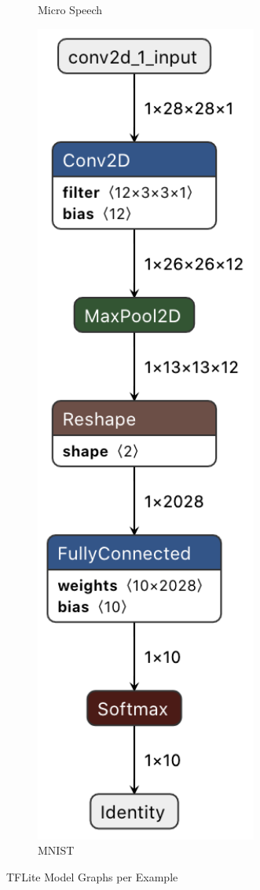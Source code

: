 \documentclass[oneside]{tum-book}
\begin{document}
\begin{figure}[h]
\begin{subfigure}[b]{0.3\textwidth}
         \caption{Micro Speech}
         \label{fig:netron_mirco_speech}
     \end{subfigure}
     \hfill
     \begin{subfigure}[b]{0.3\textwidth}
         \centering
         \includegraphics[width=0.8\textwidth]{figures/mnist_graph.png}
         \caption{MNIST}
         \label{fig:netron_mnist}
     \end{subfigure}
        \caption{TFLite Model Graphs per Example}
        \label{fig:netron}
\end{figure}
\end{document}
